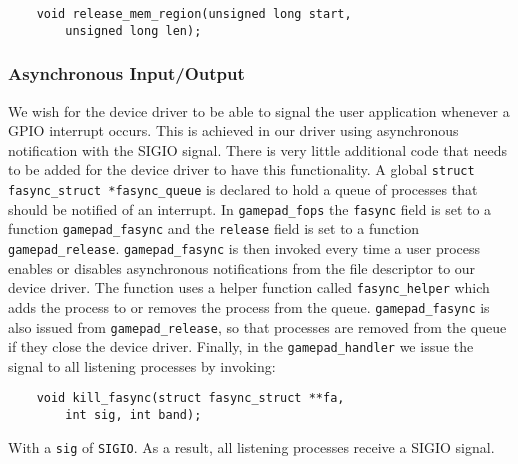 \begin{lstlisting}
	void release_mem_region(unsigned long start,
		unsigned long len);
\end{lstlisting}

\subsubsection{Asynchronous Input/Output}

We wish for the device driver to be able to signal the user application whenever
a GPIO interrupt occurs. This is achieved in our driver using asynchronous
notification with the SIGIO signal. There is very little additional code that
needs to be added for the device driver to have this functionality. A global
\texttt{struct fasync\_struct *fasync\_queue} is declared to hold a queue of
processes that should be notified of an interrupt. In \texttt{gamepad\_fops} the
\texttt{fasync} field is set to a function \texttt{gamepad\_fasync} and the
\texttt{release} field is set to a function \texttt{gamepad\_release}.
\texttt{gamepad\_fasync} is then invoked every time a user process enables or
disables asynchronous notifications from the file descriptor to our device
driver. The function uses a helper function called \texttt{fasync\_helper} which
adds the process to or removes the process from the queue.
\texttt{gamepad\_fasync} is also issued from \texttt{gamepad\_release}, so that
processes are removed from the queue if they close the device driver. Finally,
in the \texttt{gamepad\_handler} we issue the signal to all listening processes
by invoking:

\begin{lstlisting}
	void kill_fasync(struct fasync_struct **fa,
		int sig, int band);
\end{lstlisting}

With a \texttt{sig} of \texttt{SIGIO}. As a result, all listening processes
receive a SIGIO signal.
